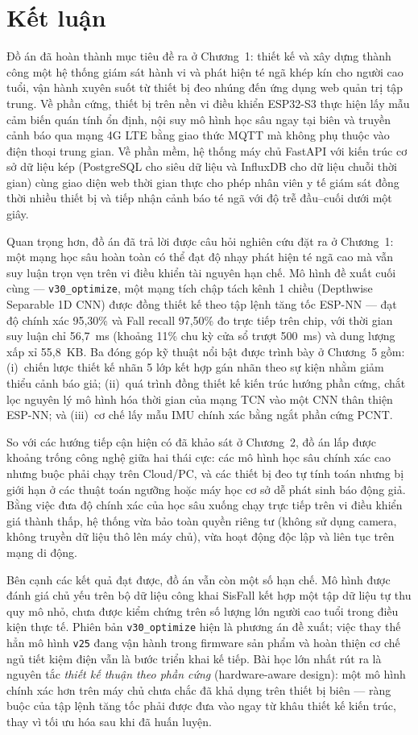 \documentclass[../DoAn.tex]{subfiles}
\begin{document}
\section{Kết luận}
Đồ án đã hoàn thành mục tiêu đề ra ở Chương~1: thiết kế và xây dựng thành công một hệ thống giám sát hành vi và phát hiện té ngã khép kín cho người cao tuổi, vận hành xuyên suốt từ thiết bị đeo nhúng đến ứng dụng web quản trị tập trung. Về phần cứng, thiết bị trên nền vi điều khiển ESP32-S3 thực hiện lấy mẫu cảm biến quán tính ổn định, nội suy mô hình học sâu ngay tại biên và truyền cảnh báo qua mạng 4G LTE bằng giao thức MQTT mà không phụ thuộc vào điện thoại trung gian. Về phần mềm, hệ thống máy chủ FastAPI với kiến trúc cơ sở dữ liệu kép (PostgreSQL cho siêu dữ liệu và InfluxDB cho dữ liệu chuỗi thời gian) cùng giao diện web thời gian thực cho phép nhân viên y tế giám sát đồng thời nhiều thiết bị và tiếp nhận cảnh báo té ngã với độ trễ đầu--cuối dưới một giây.

Quan trọng hơn, đồ án đã trả lời được câu hỏi nghiên cứu đặt ra ở Chương~1: một mạng học sâu hoàn toàn có thể đạt độ nhạy phát hiện té ngã cao mà vẫn suy luận trọn vẹn trên vi điều khiển tài nguyên hạn chế. Mô hình đề xuất cuối cùng --- \texttt{v30\_optimize}, một mạng tích chập tách kênh 1 chiều (Depthwise Separable 1D CNN) được đồng thiết kế theo tập lệnh tăng tốc ESP-NN --- đạt độ chính xác 95,30\% và Fall recall 97,50\% đo trực tiếp trên chip, với thời gian suy luận chỉ 56,7~ms (khoảng 11\% chu kỳ cửa sổ trượt 500~ms) và dung lượng xấp xỉ 55,8~KB. Ba đóng góp kỹ thuật nổi bật được trình bày ở Chương~5 gồm: (i)~chiến lược thiết kế nhãn 5 lớp kết hợp gán nhãn theo sự kiện nhằm giảm thiểu cảnh báo giả; (ii)~quá trình đồng thiết kế kiến trúc hướng phần cứng, chắt lọc nguyên lý mô hình hóa thời gian của mạng TCN vào một CNN thân thiện ESP-NN; và (iii)~cơ chế lấy mẫu IMU chính xác bằng ngắt phần cứng PCNT.

So với các hướng tiếp cận hiện có đã khảo sát ở Chương~2, đồ án lấp được khoảng trống công nghệ giữa hai thái cực: các mô hình học sâu chính xác cao nhưng buộc phải chạy trên Cloud/PC, và các thiết bị đeo tự tính toán nhưng bị giới hạn ở các thuật toán ngưỡng hoặc máy học cơ sở dễ phát sinh báo động giả. Bằng việc đưa độ chính xác của học sâu xuống chạy trực tiếp trên vi điều khiển giá thành thấp, hệ thống vừa bảo toàn quyền riêng tư (không sử dụng camera, không truyền dữ liệu thô lên máy chủ), vừa hoạt động độc lập và liên tục trên mạng di động.

Bên cạnh các kết quả đạt được, đồ án vẫn còn một số hạn chế. Mô hình được đánh giá chủ yếu trên bộ dữ liệu công khai SisFall kết hợp một tập dữ liệu tự thu quy mô nhỏ, chưa được kiểm chứng trên số lượng lớn người cao tuổi trong điều kiện thực tế. Phiên bản \texttt{v30\_optimize} hiện là phương án đề xuất; việc thay thế hẳn mô hình \texttt{v25} đang vận hành trong firmware sản phẩm và hoàn thiện cơ chế ngủ tiết kiệm điện vẫn là bước triển khai kế tiếp. Bài học lớn nhất rút ra là nguyên tắc \textit{thiết kế thuận theo phần cứng} (hardware-aware design): một mô hình chính xác hơn trên máy chủ chưa chắc đã khả dụng trên thiết bị biên --- ràng buộc của tập lệnh tăng tốc phải được đưa vào ngay từ khâu thiết kế kiến trúc, thay vì tối ưu hóa sau khi đã huấn luyện.
\end{document}
